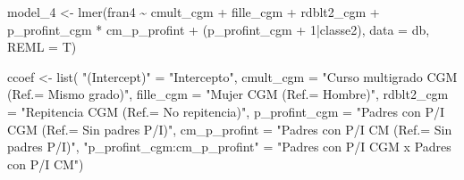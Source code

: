 \documentclass[
  12pt,
  a4paper,
]{article}
\newenvironment{Shaded}{\begin{snugshade}}{\end{snugshade}}
\newcommand{\AttributeTok}[1]{\textcolor[rgb]{0.77,0.63,0.00}{#1}}
\newcommand{\DecValTok}[1]{\textcolor[rgb]{0.00,0.00,0.81}{#1}}
\newcommand{\FunctionTok}[1]{\textcolor[rgb]{0.00,0.00,0.00}{#1}}
\newcommand{\NormalTok}[1]{#1}
\newcommand{\OtherTok}[1]{\textcolor[rgb]{0.56,0.35,0.01}{#1}}
\newcommand{\SpecialCharTok}[1]{\textcolor[rgb]{0.00,0.00,0.00}{#1}}
\newcommand{\StringTok}[1]{\textcolor[rgb]{0.31,0.60,0.02}{#1}}
\begin{document}
\begin{Shaded}
\begin{Highlighting}[]
\NormalTok{model\_4 }\OtherTok{\textless{}{-}} \FunctionTok{lmer}\NormalTok{(fran4 }\SpecialCharTok{\textasciitilde{}}\NormalTok{ cmult\_cgm }\SpecialCharTok{+}\NormalTok{ fille\_cgm }\SpecialCharTok{+} 
\NormalTok{                  rdblt2\_cgm }\SpecialCharTok{+}\NormalTok{ p\_profint\_cgm }\SpecialCharTok{*} 
\NormalTok{                  cm\_p\_profint }\SpecialCharTok{+}\NormalTok{ (p\_profint\_cgm }\SpecialCharTok{+} \DecValTok{1}\SpecialCharTok{|}\NormalTok{classe2), }
                \AttributeTok{data =}\NormalTok{ db,}
                \AttributeTok{REML =}\NormalTok{ T)}

\NormalTok{ccoef }\OtherTok{\textless{}{-}} \FunctionTok{list}\NormalTok{(}
  \StringTok{"(Intercept)"} \OtherTok{=} \StringTok{"Intercepto"}\NormalTok{,}
  \AttributeTok{cmult\_cgm =} \StringTok{"Curso multigrado CGM (Ref.= Mismo grado)"}\NormalTok{,}
  \AttributeTok{fille\_cgm =} \StringTok{"Mujer CGM (Ref.= Hombre)"}\NormalTok{,}
  \AttributeTok{rdblt2\_cgm =} \StringTok{"Repitencia CGM (Ref.= No repitencia)"}\NormalTok{,}
  \AttributeTok{p\_profint\_cgm =} \StringTok{"Padres con P/I CGM (Ref.= Sin padres P/I)"}\NormalTok{,}
  \AttributeTok{cm\_p\_profint =} \StringTok{"Padres con P/I CM (Ref.= Sin padres P/I)"}\NormalTok{,}
  \StringTok{"p\_profint\_cgm:cm\_p\_profint"} \OtherTok{=} \StringTok{"Padres con P/I CGM x Padres con P/I CM"}\NormalTok{)}



\end{Highlighting}
\end{Shaded}
\end{document}
